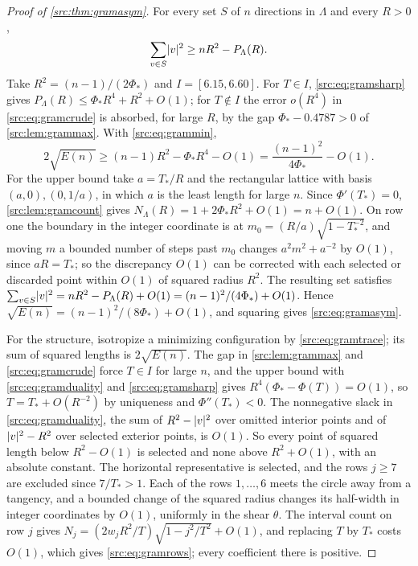 \begin{proof}[Proof of \cref{src:thm:gramasym}]
For every set $S$ of $n$ directions in $\Lambda$ and every $R>0$,
\begin{equation}\label{src:eq:gramduality}
 \sum_{v\in S}\lvert v\rvert^2\ge nR^2-P_\Lambda(R).
\end{equation}
Take $R^2=(n-1)/(2\Phi_*)$ and $I=[6.15,6.60]$. For $T\in I$, \eqref{src:eq:gramsharp} gives
$P_\Lambda(R)\le\Phi_*R^4+R^2+O(1)$; for $T\notin I$ the error $o(R^4)$ in \eqref{src:eq:gramcrude} is
absorbed, for large $R$, by the gap $\Phi_*-0.4787>0$ of \cref{src:lem:grammax}. With
\eqref{src:eq:grammin},
\[
 2\sqrt{E(n)}\ge(n-1)R^2-\Phi_*R^4-O(1)=\frac{(n-1)^2}{4\Phi_*}-O(1).
\]
For the upper bound take $a=T_*/R$ and the rectangular lattice with basis $(a,0),(0,1/a)$, in which $a$ is
the least length for large $n$. Since $\Phi'(T_*)=0$, \cref{src:lem:gramcount} gives
$N_\Lambda(R)=1+2\Phi_*R^2+O(1)=n+O(1)$. On row one the boundary in the integer coordinate is at
$m_0=(R/a)\sqrt{1-T_*^{-2}}$, and moving $m$ a bounded number of steps past $m_0$ changes
$a^2m^2+a^{-2}$ by $O(1)$, since $aR=T_*$; so the discrepancy $O(1)$ can be corrected with each selected
or discarded point within $O(1)$ of squared radius $R^2$. The resulting set satisfies
$\sum_{v\in S}\lvert v\rvert^2=nR^2-P_\Lambda(R)+O(1)=(n-1)^2/(4\Phi_*)+O(1)$. Hence
$\sqrt{E(n)}=(n-1)^2/(8\Phi_*)+O(1)$, and squaring gives \eqref{src:eq:gramasym}.

For the structure, isotropize a minimizing configuration by \eqref{src:eq:gramtrace}; its sum of squared
lengths is $2\sqrt{E(n)}$. The gap in \cref{src:lem:grammax} and \eqref{src:eq:gramcrude} force $T\in I$
for large $n$, and the upper bound with \eqref{src:eq:gramduality} and \eqref{src:eq:gramsharp} gives
$R^4(\Phi_*-\Phi(T))=O(1)$, so $T=T_*+O(R^{-2})$ by uniqueness and $\Phi''(T_*)<0$. The nonnegative slack
in \eqref{src:eq:gramduality}, the sum of $R^2-\lvert v\rvert^2$ over omitted interior points and of $\lvert v\rvert^2-R^2$
over selected exterior points, is $O(1)$. So every point of squared length below $R^2-O(1)$ is selected and
none above $R^2+O(1)$, with an absolute constant. The horizontal representative is selected, and the rows
$j\ge7$ are excluded since $7/T_*>1$. Each of the rows $1,\dots,6$ meets the circle away from a tangency,
and a bounded change of the squared radius changes its half-width in integer coordinates by $O(1)$,
uniformly in the shear $\theta$. The interval count on row $j$ gives
$N_j=(2w_jR^2/T)\sqrt{1-j^2/T^2}+O(1)$, and replacing $T$ by $T_*$ costs $O(1)$, which gives
\eqref{src:eq:gramrows}; every coefficient there is positive.
\end{proof}

